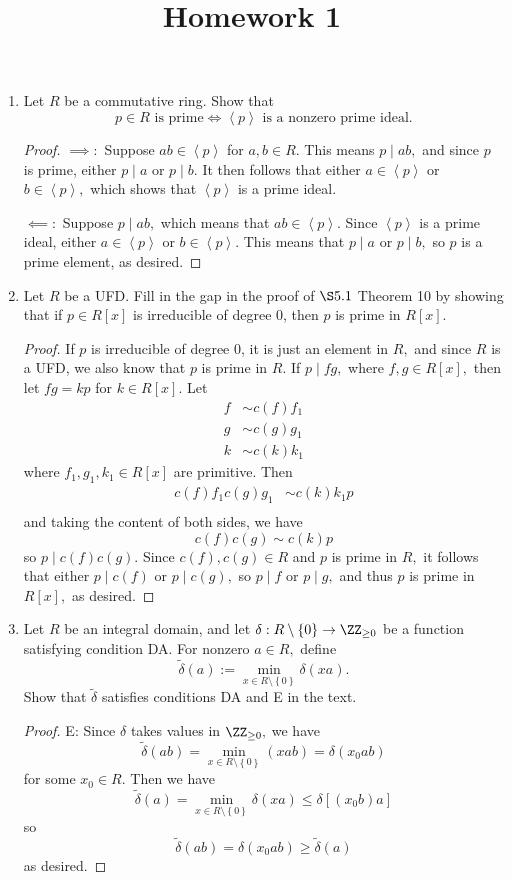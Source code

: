 \documentclass{article}
\begin{document}
\title{Homework 1}
\maketitle
\thispagestyle{fancy}

\begin{enumerate}
	\item Let $R$ be a commutative ring. Show that
		\[p\in R\text{ is prime} \iff \left< p\right>\text{ is a nonzero prime ideal.}\]
		\begin{proof}
			$\implies: $ Suppose $ab\in\left< p\right>$ for $a, b\in R.$ This means $p\mid ab,$ and since $p$ is prime, either $p\mid a$ or $p\mid b.$ It then follows that either $a\in \left< p\right>$ or $b\in \left< p\right>,$ which shows that $\left< p\right>$ is a prime ideal.

			$\impliedby: $ Suppose $p\mid ab,$ which means that $ab\in \left< p\right>.$ Since $\left< p\right>$ is a prime ideal, either $a\in \left< p\right>$ or $b\in\left< p\right>.$ This means that $p\mid a$ or $p\mid b,$ so $p$ is a prime element, as desired.
		\end{proof}

	\item Let $R$ be a UFD. Fill in the gap in the proof of $\S5.1$ Theorem 10 by showing that if $p\in R[x]$ is irreducible of degree 0, then $p$ is prime in $R[x].$
		\begin{proof}
			If $p$ is irreducible of degree 0, it is just an element in $R,$ and since $R$ is a UFD, we also know that $p$ is prime in $R.$ If $p\mid fg,$ where $f, g\in R[x],$ then let $fg=kp$ for $k\in R[x].$ Let
			\begin{align*}
				f &\sim c(f) f_1 \\
				g &\sim c(g) g_1 \\
				k &\sim c(k)k_1
			\end{align*}
			where $f_1, g_1, k_1\in R[x]$ are primitive. Then
			\begin{align*}
				c(f)f_1c(g)g_1 &\sim c(k) k_1 p \\
			\end{align*}
			and taking the content of both sides, we have
			\[c(f)c(g) \sim c(k)p\]
			so $p\mid c(f) c(g).$ Since $c(f), c(g)\in R$ and $p$ is prime in $R,$ it follows that either $p\mid c(f)$ or $p\mid c(g),$ so $p\mid f$ or $p\mid g,$ and thus $p$ is prime in $R[x],$ as desired.
		\end{proof}

	\item Let $R$ be an integral domain, and let $\delta:R\setminus\left\{ 0 \right\}\to\ZZ_{\ge0}$ be a function satisfying condition DA. For nonzero $a\in R,$ define
		\[\tilde{\delta}(a):=\min_{x\in R\setminus\left\{ 0 \right\}} \delta(xa).\]
		Show that $\tilde{\delta}$ satisfies conditions DA and E in the text.
		\begin{proof}
			E: Since $\delta$ takes values in $\ZZ_{\ge0},$ we have
			\[\tilde\delta(ab)=\min_{x\in R\setminus\left\{ 0 \right\}}(xab) = \delta(x_0 ab)\]
			for some $x_0\in R.$ Then we have
			\[\tilde\delta(a) = \min_{x\in R\setminus\left\{ 0 \right\}} \delta(xa)\le \delta[(x_0b)a]\]
			so
			\[\tilde\delta(ab)=\delta(x_0ab)\ge \tilde\delta(a)\]
			as desired.


\end{proof}
\end{enumerate}
\end{document}
